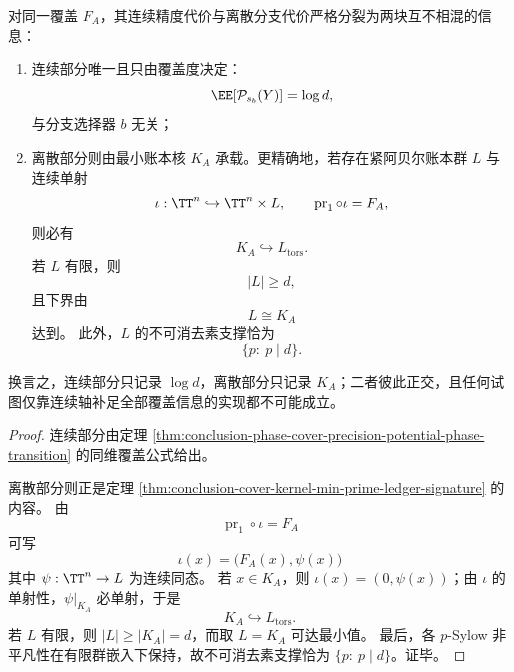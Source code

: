 \begin{theorem}[线性相位覆盖的连续代价与离散代价完全正交]\label{thm:conclusion-phase-cover-continuous-discrete-cost-orthogonality}
对同一覆盖 \(F_A\)，其连续精度代价与离散分支代价严格分裂为两块互不相混的信息：
\begin{enumerate}
  \item 连续部分唯一且只由覆盖度决定：
  \[
  \EE[\mathcal P_{s_b}(Y)]=\log d,
  \]
  与分支选择器 \(b\) 无关；
  \item 离散部分则由最小账本核 \(K_A\) 承载。更精确地，若存在紧阿贝尔账本群 \(L\) 与连续单射
  \[
  \iota:\TT^n\hookrightarrow \TT^n\times L,
  \qquad
  \operatorname{pr}_1\circ \iota=F_A,
  \]
  则必有
  \[
  K_A\hookrightarrow L_{\mathrm{tors}}.
  \]
  若 \(L\) 有限，则
  \[
  |L|\ge d,
  \]
  且下界由
  \[
  L\cong K_A
  \]
  达到。
  此外，\(L\) 的不可消去素支撑恰为
  \[
  \{p:\ p\mid d\}.
  \]
\end{enumerate}
换言之，连续部分只记录 \(\log d\)，离散部分只记录 \(K_A\)；二者彼此正交，且任何试图仅靠连续轴补足全部覆盖信息的实现都不可能成立。
\end{theorem}
\begin{proof}
连续部分由定理 \ref{thm:conclusion-phase-cover-precision-potential-phase-transition} 的同维覆盖公式给出。

离散部分则正是定理 \ref{thm:conclusion-cover-kernel-min-prime-ledger-signature} 的内容。
由
\[
\operatorname{pr}_1\circ \iota=F_A
\]
可写
\[
\iota(x)=\bigl(F_A(x),\psi(x)\bigr)
\]
其中 \(\psi:\TT^n\to L\) 为连续同态。
若 \(x\in K_A\)，则 \(\iota(x)=(0,\psi(x))\)；由 \(\iota\) 的单射性，\(\psi|_{K_A}\) 必单射，于是
\[
K_A\hookrightarrow L_{\mathrm{tors}}.
\]
若 \(L\) 有限，则 \(|L|\ge |K_A|=d\)，而取 \(L=K_A\) 可达最小值。
最后，各 \(p\)-Sylow 非平凡性在有限群嵌入下保持，故不可消去素支撑恰为 \(\{p:\ p\mid d\}\)。证毕。
\end{proof}

